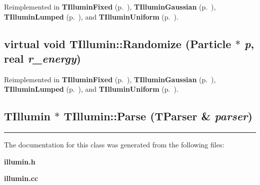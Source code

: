 Reimplemented in {\bf TIllumin\-Fixed} {\rm (p.~\pageref{TIlluminFixed_a1})}, {\bf TIllumin\-Gaussian} {\rm (p.~\pageref{TIlluminGaussian_a1})}, {\bf TIllumin\-Lumped} {\rm (p.~\pageref{TIlluminLumped_a1})}, and {\bf TIllumin\-Uniform} {\rm (p.~\pageref{TIlluminUniform_a1})}.\label{TIllumin_a1}
\subsection{\setlength{\rightskip}{0pt plus 5cm}virtual void TIllumin::Randomize ({\bf Particle} $\ast$ {\em p}, {\bf real} {\em r\_\-energy})\hspace{0.3cm}{\tt  [virtual]}}



Reimplemented in {\bf TIllumin\-Fixed} {\rm (p.~\pageref{TIlluminFixed_a2})}, {\bf TIllumin\-Gaussian} {\rm (p.~\pageref{TIlluminGaussian_a2})}, {\bf TIllumin\-Lumped} {\rm (p.~\pageref{TIlluminLumped_a2})}, and {\bf TIllumin\-Uniform} {\rm (p.~\pageref{TIlluminUniform_a2})}.\label{TIllumin_d0}
\subsection{\setlength{\rightskip}{0pt plus 5cm}TIllumin $\ast$ TIllumin::Parse ({\bf TParser} \& {\em parser})\hspace{0.3cm}{\tt  [static]}}

\vspace{0.4cm}\hrule\vspace{0.2cm}
The documentation for this class was generated from the following files:\begin{CompactItemize}
\item 
{\bf illumin.h}\item 
{\bf illumin.cc}\end{CompactItemize}
